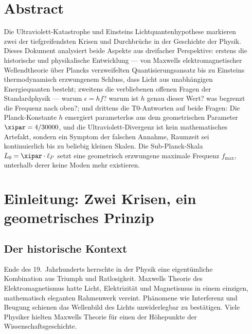 
\section*{Abstract}

Die Ultraviolett-Katastrophe und Einsteins Lichtquantenhypothese markieren zwei der 
tiefgreifendsten Krisen und Durchbrüche in der Geschichte der Physik. Dieses Dokument 
analysiert beide Aspekte aus dreifacher Perspektive: erstens die historische und 
physikalische Entwicklung — von Maxwells elektromagnetischer Wellendtheorie über 
Plancks verzweifelten Quantisierungsansatz bis zu Einsteins thermodynamisch erzwungenem 
Schluss, dass Licht aus unabhängigen Energiequanten besteht; zweitens die verbliebenen 
offenen Fragen der Standardphysik — warum $\epsilon = hf$? warum ist $h$ genau dieser 
Wert? was begrenzt die Frequenz nach oben?; und drittens die T0-Antworten auf beide 
Fragen: Die Planck-Konstante $h$ emergiert parameterlos aus dem geometrischen Parameter 
$\xipar = 4/30000$, und die Ultraviolett-Divergenz ist kein mathematisches Artefakt, 
sondern ein Symptom der falschen Annahme, Raumzeit sei kontinuierlich bis zu beliebig 
kleinen Skalen. Die Sub-Planck-Skala $L_0 = \xipar \cdot \ell_P$ setzt eine geometrisch 
erzwungene maximale Frequenz $f_{\max}$, unterhalb derer keine Moden mehr existieren.

\clearpage

\section{Einleitung: Zwei Krisen, ein geometrisches Prinzip}
\label{sec:intro}

\subsection{Der historische Kontext}

Ende des 19.~Jahrhunderts herrschte in der Physik eine eigentümliche Kombination aus 
Triumph und Ratlosigkeit. Maxwells Theorie des Elektromagnetismus hatte Licht, 
Elektrizität und Magnetismus in einem einzigen, mathematisch eleganten Rahmenwerk 
vereint. Phänomene wie Interferenz und Beugung schienen das Wellenbild des Lichts 
unwiderlegbar zu bestätigen. Viele Physiker hielten Maxwells Theorie für einen der 
Höhepunkte der Wissenschaftsgeschichte.

